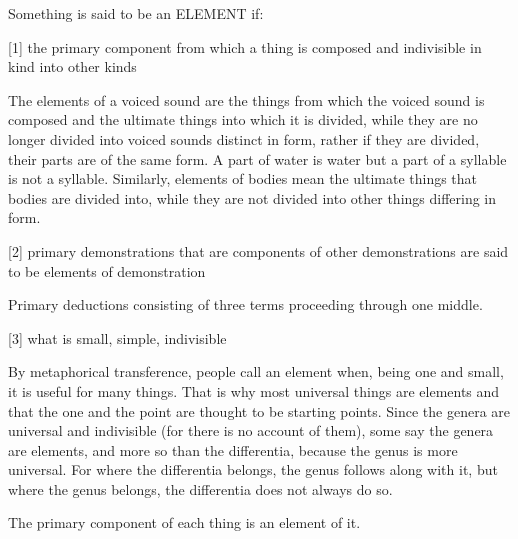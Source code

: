 
Something is said to be an ELEMENT if:

[1]     the primary component from which a thing is composed
        and indivisible in kind into other kinds

        The elements of a voiced sound are the things from which
        the voiced sound is composed and the ultimate things
        into which it is divided, while they are no longer divided
        into voiced sounds distinct in form, rather if they are divided,
        their parts are of the same form. A part of water is water but
        a part of a syllable is not a syllable. Similarly, elements of bodies
        mean the ultimate things that bodies are divided into, while
        they are not divided into other things differing in form.

[2]     primary demonstrations that are components of other demonstrations
        are said to be elements of demonstration
        
        Primary deductions consisting of three terms proceeding through one middle.

[3]     what is small, simple, indivisible

        By metaphorical transference, people call an element when,
        being one and small, it is useful for many things. That is why
        most universal things are elements and that the one and the point
        are thought to be starting points. Since the genera are 
        universal and indivisible (for there is no account of them),
        some say the genera are elements, and more so than the differentia,
        because the genus is more universal. For where the differentia belongs,
        the genus follows along with it, but where the genus belongs,
        the differentia does not always do so.

The primary component of each thing is an element of it.
